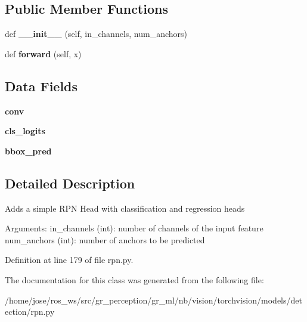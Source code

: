 \subsection*{Public Member Functions}
\begin{DoxyCompactItemize}
\item 
\mbox{\label{classtorchvision_1_1models_1_1detection_1_1rpn_1_1RPNHead_a19dd164defa01f9b3443b4aa035179e6}} 
def {\bfseries \+\_\+\+\_\+init\+\_\+\+\_\+} (self, in\+\_\+channels, num\+\_\+anchors)
\item 
\mbox{\label{classtorchvision_1_1models_1_1detection_1_1rpn_1_1RPNHead_a862d4f2a9a6c87304d2a0c642e6a6079}} 
def {\bfseries forward} (self, x)
\end{DoxyCompactItemize}
\subsection*{Data Fields}
\begin{DoxyCompactItemize}
\item 
\mbox{\label{classtorchvision_1_1models_1_1detection_1_1rpn_1_1RPNHead_a960bc781cfafbd3841f6663a38054789}} 
{\bfseries conv}
\item 
\mbox{\label{classtorchvision_1_1models_1_1detection_1_1rpn_1_1RPNHead_a0c63648838806daad7fbec1972d5c118}} 
{\bfseries cls\+\_\+logits}
\item 
\mbox{\label{classtorchvision_1_1models_1_1detection_1_1rpn_1_1RPNHead_ad39b1ff5d30fbc0dacb13aa384eae8d4}} 
{\bfseries bbox\+\_\+pred}
\end{DoxyCompactItemize}


\subsection{Detailed Description}
\begin{DoxyVerb}Adds a simple RPN Head with classification and regression heads

Arguments:
    in_channels (int): number of channels of the input feature
    num_anchors (int): number of anchors to be predicted
\end{DoxyVerb}
 

Definition at line 179 of file rpn.\+py.



The documentation for this class was generated from the following file\+:\begin{DoxyCompactItemize}
\item 
/home/jose/ros\+\_\+ws/src/gr\+\_\+perception/gr\+\_\+ml/nb/vision/torchvision/models/detection/rpn.\+py\end{DoxyCompactItemize}
